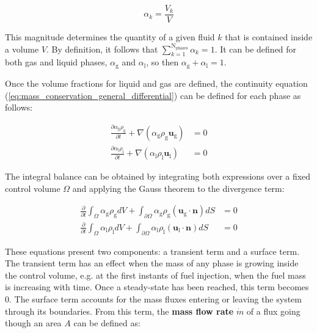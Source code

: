 \begin{equation}
\label{eq:vol_frac_definition}
\alpha_k = \frac{V_k}{V}
\end{equation}

This magnitude determines the quantity of a given fluid $k$ that is contained inside a volume $V$. By definition, it follows that $\sum_{k=1}^\mathrm{N_{phases}} \alpha_k = 1$. It can be defined for both gas and liquid phases, $\alpha_\mathrm{g}$ and $\alpha_\mathrm{l}$, so then $\alpha_\mathrm{g} + \alpha_\mathrm{l} = 1$.

Once the volume fractions for liquid and gas are defined, the continuity equation (\ref{eq:mass_conservation_general_differential}) can be defined for each phase as follows:

\begin{subequations}
\begin{align}
\frac{\partial \alpha_\mathrm{g} \rho_\mathrm{g} }{\partial t} + \nabla \left( \alpha_\mathrm{g} \rho_\mathrm{g} \boldsymbol{u}_\mathrm{g} \right) &= 0  \\
\frac{\partial \alpha_\mathrm{l} \rho_\mathrm{l} }{\partial t} + \nabla \left( \alpha_\mathrm{l} \rho_\mathrm{l} \boldsymbol{u}_\mathrm{l} \right) &= 0
\end{align}
\end{subequations}

The integral balance can be obtained by integrating both expressions over a fixed control volume $\Omega$ and applying the Gauss theorem to the divergence term:

\begin{subequations}
\label{eq:mass_conservation_general_bothPhases_showingIntegrals}
\begin{align}
\frac{\partial}{\partial t} \int_{\Omega} \alpha_\mathrm{g} \rho_\mathrm{g} dV + \int_{\partial {\Omega}} \alpha_\mathrm{g} \rho_\mathrm{g} \left( \boldsymbol{u}_\mathrm{g} \cdot \boldsymbol{n} \right) dS &= 0  \\
\frac{\partial}{\partial t} \int_{\Omega} \alpha_\mathrm{l} \rho_\mathrm{l} dV + \int_{\partial {\Omega}} \alpha_\mathrm{l} \rho_\mathrm{l} \left( \boldsymbol{u}_\mathrm{l} \cdot \boldsymbol{n} \right) dS &= 0 
\end{align}
\end{subequations}

These equations present two components: a transient term and a surface term. The transient term has an effect when the mass of any phase is growing inside the control volume, e.g. at the first instants of fuel injection, when the fuel mass is increasing with time. Once a steady-state has been reached, this term becomes $0$. The surface term accounts for the mass fluxes entering or leaving the system through its boundaries. From this term, the \textbf{mass flow rate} $\dot{m}$ of a flux going though an area $A$ can be defined as:

